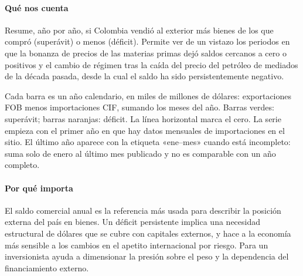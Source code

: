 \paragraph{Qué nos cuenta}
Resume, año por año, si Colombia vendió al exterior más bienes de los que compró (superávit) o menos (déficit). Permite ver de un vistazo los periodos en que la bonanza de precios de las materias primas dejó saldos cercanos a cero o positivos y el cambio de régimen tras la caída del precio del petróleo de mediados de la década pasada, desde la cual el saldo ha sido persistentemente negativo.

\begin{leer}
Cada barra es un año calendario, en miles de millones de dólares: exportaciones FOB menos importaciones CIF, sumando los meses del año. Barras verdes: superávit; barras naranjas: déficit. La línea horizontal marca el cero. La serie empieza con el primer año en que hay datos mensuales de importaciones en el sitio. El último año aparece con la etiqueta «ene–mes» cuando está incompleto: suma solo de enero al último mes publicado y no es comparable con un año completo.
\end{leer}

\paragraph{Por qué importa}
El saldo comercial anual es la referencia más usada para describir la posición externa del país en bienes. Un déficit persistente implica una necesidad estructural de dólares que se cubre con capitales externos, y hace a la economía más sensible a los cambios en el apetito internacional por riesgo. Para un inversionista ayuda a dimensionar la presión sobre el peso y la dependencia del financiamiento externo.

